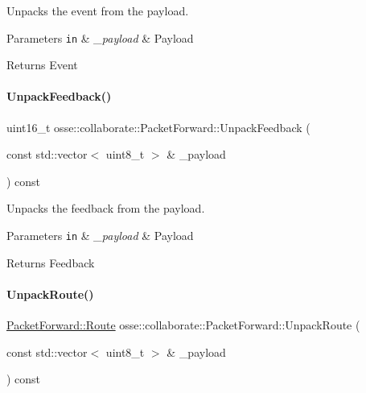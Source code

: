 Unpacks the event from the payload. 


\begin{DoxyParams}[1]{Parameters}
\mbox{\tt in}  & {\em \+\_\+payload} & Payload \\
\hline
\end{DoxyParams}
\begin{DoxyReturn}{Returns}
Event 
\end{DoxyReturn}
\mbox{\label{classosse_1_1collaborate_1_1_packet_forward_a4498a5e0e0c38145f88238df36ad815d}} 
\paragraph{\texorpdfstring{Unpack\+Feedback()}{UnpackFeedback()}}
{\footnotesize\ttfamily uint16\+\_\+t osse\+::collaborate\+::\+Packet\+Forward\+::\+Unpack\+Feedback (\begin{DoxyParamCaption}\item[{const std\+::vector$<$ uint8\+\_\+t $>$ \&}]{\+\_\+payload }\end{DoxyParamCaption}) const\hspace{0.3cm}{\ttfamily [private]}}



Unpacks the feedback from the payload. 


\begin{DoxyParams}[1]{Parameters}
\mbox{\tt in}  & {\em \+\_\+payload} & Payload \\
\hline
\end{DoxyParams}
\begin{DoxyReturn}{Returns}
Feedback 
\end{DoxyReturn}
\mbox{\label{classosse_1_1collaborate_1_1_packet_forward_a34d3be1f164ab0b1ee52396c8e5ec2cc}} 
\paragraph{\texorpdfstring{Unpack\+Route()}{UnpackRoute()}}
{\footnotesize\ttfamily \hyperlink{classosse_1_1collaborate_1_1_packet_forward_a5b42a7c3605c5a6c7e0880599b213240}{Packet\+Forward\+::\+Route} osse\+::collaborate\+::\+Packet\+Forward\+::\+Unpack\+Route (\begin{DoxyParamCaption}\item[{const std\+::vector$<$ uint8\+\_\+t $>$ \&}]{\+\_\+payload }\end{DoxyParamCaption}) const\hspace{0.3cm}{\ttfamily [private]}}



